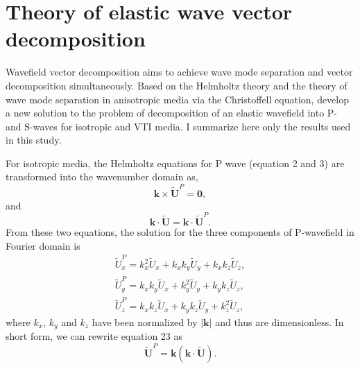 \section{Theory of elastic wave vector decomposition}

Wavefield vector decomposition aims to achieve wave mode separation and vector decomposition simultaneously.
Based on the Helmholtz theory and the theory of wave mode separation in anisotropic
media via the Christoffell equation, \cite{zhang.mcmechan:2010} 
develop a new solution to the problem of decomposition of an elastic wavefield into P- and S-waves for
isotropic and VTI media. I summarize here only the results used in this study.

For isotropic media, the Helmholtz equations for P wave (equation 2 and 3) are transformed into the wavenumber
 domain as,
\begin{equation}
\mathbf{k}\times\tilde{\mathbf{U}}^P = \mathbf{0},
\end{equation}
and
\begin{equation}
\mathbf{k}\cdot\tilde{\mathbf{U}} = \mathbf{k}\cdot\tilde{\mathbf{U}}^P.
\end{equation}
From these two equations, the solution for the three components of P-wavefield in Fourier domain is
 \cite[]{zhang.mcmechan:2010}
\begin{equation}
\begin{array}{l}
\displaystyle
\tilde{U}^P_{x} = k_{x}^2\tilde{U}_{x} + k_{x}k_{y}\tilde{U}_{y} + k_{x}k_{z}\tilde{U}_{z},
\nonumber \\
\displaystyle
\tilde{U}^P_{y} = k_{x}k_{y}\tilde{U}_{x} + k_{y}^2\tilde{U}_{y} + k_{y}k_{z}\tilde{U}_{z},
\nonumber \\
\displaystyle
\tilde{U}^P_{z} = k_{x}k_{z}\tilde{U}_{x} + k_{y}k_{z}\tilde{U}_{y} + k_{z}^2\tilde{U}_{z},
\end{array}
\end{equation}
where $k_{x}$, $k_{y}$ and $k_{z}$ have been normalized by $|\mathbf{k}|$ and thus are dimensionless.
In short form, we can rewrite equation 23 as
\begin{equation}
\tilde{\mathbf{U}}^P = \mathbf{k}(\mathbf{k}\cdot\tilde{\mathbf{U}}).
\end{equation}

